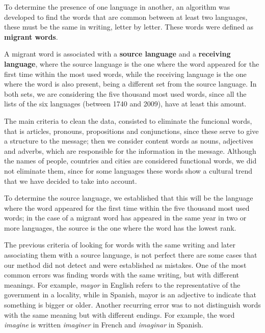 \documentclass[10pt,letterpaper]{article} %
\begin{document}
	
	To determine the presence of one language in another, an algorithm was
	developed to find the words that are common between at least two languages,
	these must be the same in writing, letter by letter. These words were defined as \textbf{migrant words}. 
	
	A migrant word is associated with a \textbf{source language} and a
	\textbf{receiving language}, where the source language is the one where the
	word appeared for the first time within the most used words,
	while the receiving language is the one where the word is also present, being a
	different set from the source language. In both sets, we are considering the five thousand most used words, since all the lists of the six languages (between 1740 and 2009), have at least this amount.  
	
	The main criteria to clean the data, consisted to eliminate the funcional words, that is articles, pronouns, propositions and conjunctions, since these serve to give a structure to the message;  then we consider content words as nouns, adjectives and adverbs, which are responsible for the information in the message. Although the names of people, countries and cities are considered functional words, we did not eliminate them, since for some languages these words show a cultural trend that we have decided to take into account.
	
	To determine the source language, we established that this will be the language where the word appeared for the first time within the five thousand most used words; in the case of a migrant word has appeared in the same year in two or more languages, the source is the one where the word has the lowest rank.
	
	
	
	
	The previous criteria of looking for words with the same writing and later
	associating them with a source language, is not perfect there are some cases that our method did not detect and were established as mistakes. One of the most common errors was finding words with the same writing, but with different meanings. For example,  \textit{mayor} in English refers to the representative of the government in a locality, while in Spanish,  mayor is an adjective to indicate that something
	is bigger or older.  Another recurring error was to not distinguish words with the same meaning but with different endings. For example, the word \textit{imagine} is written \textit{imaginer} in French and \textit{imaginar} in Spanish.
	
\end{document}
